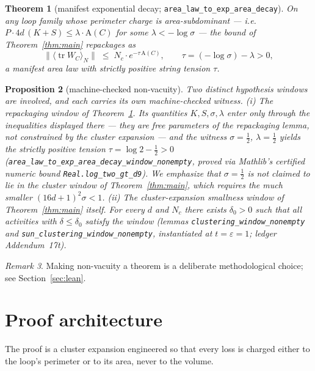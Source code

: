 \documentclass[11pt]{article}
\newtheorem{theorem}{Theorem}[section]
\newtheorem{proposition}[theorem]{Proposition}
\theoremstyle{remark}
\newtheorem{remark}[theorem]{Remark}
\newcommand{\tr}{\operatorname{tr}}
\newcommand{\loopsupp}{P}
\newcommand{\Area}{\mathrm{A}}
\begin{document}
\begin{theorem}[manifest exponential decay;
\texttt{area\_law\_to\_exp\_area\_decay}]\label{thm:tension}
On any loop family whose perimeter charge is area-subdominant --- i.e.\
$\loopsupp \cdot 4d\,(K + S) \le \lambda \cdot \Area(C)$ for some
$\lambda < -\log\sigma$ --- the bound of Theorem~\ref{thm:main} repackages
as
\[
  \bigl\lVert \langle \tr W_C \rangle_N \bigr\rVert
  \;\le\; N_c \cdot e^{-\tau\,\Area(C)},
  \qquad \tau = (-\log\sigma) - \lambda > 0 ,
\]
a manifest area law with strictly positive string tension $\tau$.
\end{theorem}

\begin{proposition}[machine-checked non-vacuity]\label{prop:nonvacuous}
Two distinct hypothesis windows are involved, and each carries its own
machine-checked witness.
\emph{(i) The repackaging window of Theorem~\ref{thm:tension}.}  Its
quantities $K, S, \sigma, \lambda$ enter only through the inequalities
displayed there --- they are free parameters of the repackaging lemma, not
constrained by the cluster expansion --- and the witness
$\sigma = \tfrac12$, $\lambda = \tfrac12$ yields the strictly positive
tension $\tau = \log 2 - \tfrac12 > 0$
(\texttt{area\_law\_to\_exp\_area\_decay\_window\_nonempty}, proved via
Mathlib's certified numeric bound \texttt{Real.log\_two\_gt\_d9}).  We
emphasize that $\sigma = \tfrac12$ is \emph{not} claimed to lie in the
cluster window of Theorem~\ref{thm:main}, which requires the much smaller
$(16d+1)^2\sigma < 1$.
\emph{(ii) The cluster-expansion smallness window of
Theorem~\ref{thm:main} itself.}  For every $d$ and $N_c$ there exists
$\delta_0 > 0$ such that all activities with $\delta \le \delta_0$ satisfy
the window (lemmas \texttt{clustering\_window\_nonempty} and
\texttt{sun\_clustering\_window\_nonempty}, instantiated at
$t = \varepsilon = 1$; ledger Addendum~17t).
\end{proposition}

\begin{remark}
Making non-vacuity a theorem is a deliberate methodological choice; see
Section~\ref{sec:lean}.
\end{remark}

\section{Proof architecture}\label{sec:architecture}

The proof is a cluster expansion engineered so that every loss is charged
either to the loop's perimeter or to its area, never to the volume.
\end{document}
